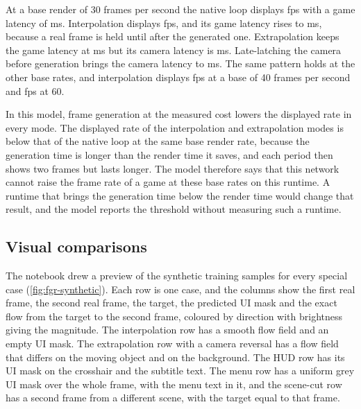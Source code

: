 \UnderRevision{} At a base render of 30 frames per second the native loop displays  fps with a game latency of  ms. Interpolation displays  fps, and its game latency rises to  ms, because a real frame is held until after the generated one. Extrapolation keeps the game latency at  ms but its camera latency is  ms. Late-latching the camera before generation brings the camera latency to  ms. The same pattern holds at the other base rates, and interpolation displays  fps at a base of 40 frames per second and  fps at 60.

\Preliminary{} In this model, frame generation at the measured cost lowers the displayed rate in every mode. The displayed rate of the interpolation and extrapolation modes is below that of the native loop at the same base render rate, because the generation time is longer than the render time it saves, and each period then shows two frames but lasts longer. The model therefore says that this network cannot raise the frame rate of a game at these base rates on this runtime. A runtime that brings the generation time below the render time would change that result, and the model reports the threshold without measuring such a runtime.

\clearpage
\subsection{Visual comparisons}\label{sec:fgr-visual}

The notebook drew a preview of the synthetic training samples for every special case (\cref{fig:fgr-synthetic}). Each row is one case, and the columns show the first real frame, the second real frame, the target, the predicted UI mask and the exact flow from the target to the second frame, coloured by direction with brightness giving the magnitude. \Observation{} The interpolation row has a smooth flow field and an empty UI mask. The extrapolation row with a camera reversal has a flow field that differs on the moving object and on the background. The HUD row has its UI mask on the crosshair and the subtitle text. The menu row has a uniform grey UI mask over the whole frame, with the menu text in it, and the scene-cut row has a second frame from a different scene, with the target equal to that frame.

